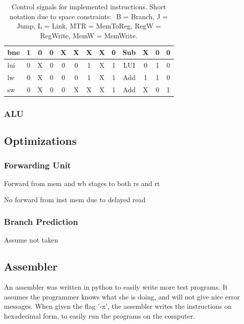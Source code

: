 \begin{table}[ht]
\begin{tabular}{|l|c|c|c|c|c|c|c|c|c|c|c|c|}
        bne        & 1 & 0 & 0 & X & X & X & X & 0 & Sub & X & 0 & 0 \\
        \hline
        lui        & 0 & X & 0 & 0 & 0 & 1 & X & 1 & LUI & 0 & 1 & 0 \\
        lw         & 0 & X & 0 & 0 & 0 & 1 & X & 1 & Add & 1 & 1 & 0 \\
        sw         & 0 & X & 0 & 0 & X & X & X & 1 & Add & X & 0 & 1 \\
        \hline
    \end{tabular}
    \caption{Control signals for implemented instructions. Short notation due to space constraints: $ $ B = Branch, J = Jump, L = Link, MTR = MemToReg, RegW = RegWrite, MemW = MemWrite.}
    \label{table:ctrlsignals}
\end{table}

\subsubsection*{ALU}

\subsection{Optimizations}
\subsubsection*{Forwarding Unit}

Forward from mem and wb stages to both rs and rt

No forward from inst mem due to delayed read

\subsubsection*{Branch Prediction}

Assume not taken

\subsection{Assembler}
An assembler was written in python to easily write more test programs. It
assumes the programmer knows what she is doing, and will not give nice error
messages. When given the flag '-x', the assembler writes the instructions on
hexadecimal form, to easily run the programs on the computer.
